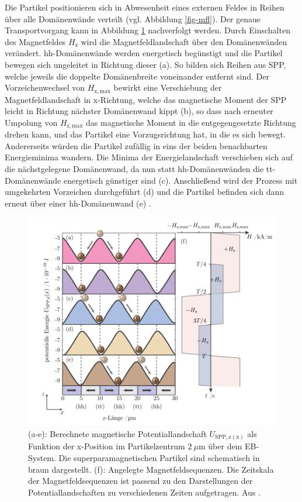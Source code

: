 \documentclass[page,pdftex,12pt,a4paper,twoside,openright]{scrbook}
\begin{document}
Die Partikel positionieren sich in Abwesenheit eines externen Feldes in Reihen über alle Domänenwände verteilt (vgl. Abbildung \ref{fig-mfl}). Der genaue Transportvorgang kann in Abbildung \ref{fig-transport} nachverfolgt werden. Durch Einschalten des Magnetfeldes \(H_\mathrm{z}\) wird die Magnetfeldlandschaft über den Domänenwänden verändert. hh-Domänenwände werden energetisch begünstigt und die Partikel bewegen sich ungeleitet in Richtung dieser (a). So bilden sich Reihen aus SPP, welche jeweils die doppelte Domänenbreite voneinander entfernt sind. Der Vorzeichenwechsel von \(H_\mathrm{x,max}\) bewirkt eine Verschiebung der Magnetfeldlandschaft in x-Richtung, welche das magnetische Moment der SPP leicht in Richtung nächster Domänenwand kippt (b), so dass nach erneuter Umpolung von \(H_\mathrm{z,max}\) das magnetische Moment in die entgegengesetzte Richtung drehen kann, und das Partikel eine Vorzugsrichtung hat, in die es sich bewegt. Andererseits würden die Partikel zufällig in eins der beiden benachbarten Energieminima wandern. Die Minima der Energielandschaft verschieben sich auf die nächstgelegene Domänenwand, da nun statt hh-Domänenwänden die tt-Domänenwände energetisch günstiger sind (c). Anschließend wird der Prozess mit umgekehrten Vorzeichen durchgeführt (d) und die Partikel befinden sich dann erneut über einer hh-Domänenwand (e) \cite{holzinger_directed_2015}. 

\begin{figure}[h]
\centering
\includegraphics[width=\textwidth]{img/trapez.png}
\caption{\label{fig-transport}
(a-e): Berechnete magnetische Potentiallandschaft \(U_\mathrm{SPP,z(x)}\) als Funktion der x-Position im Partikelzentrum \(\SI{2}{\mu\meter}\) über dem EB-System. Die superparamagnetischen Partikel sind schematisch in braun dargestellt. (f): Angelegte Magnetfeldsequenzen. Die Zeitskala der Magnetfeldsequenzen ist passend zu den Darstellungen der Potentiallandschaften zu verschiedenen Zeiten aufgetragen. Aus \cite{holzinger_transport_2015}.}
\end{figure}
\end{document}
